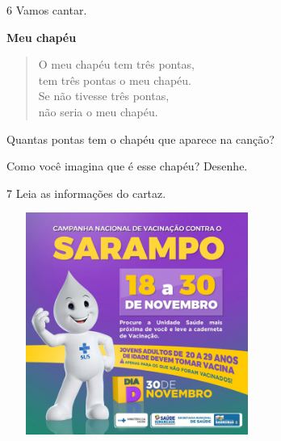\num{6} Vamos cantar.

\textbf{Meu chapéu}

\begin{verse}
O meu chapéu tem três pontas,\\
tem três pontas o meu chapéu.\\
Se não tivesse três pontas,\\
não seria o meu chapéu.
\end{verse}


\begin{escolha}
\item Quantas pontas tem o chapéu que aparece na canção?


\item Como você imagina que é esse chapéu? Desenhe.

\begin{mdframed}[linewidth=2pt,linecolor=salmao,roundcorner=10pt]
\vspace{5cm}
\end{mdframed}
\end{escolha}

\num{7} Leia as informações do cartaz.


\includegraphics[width=3.36943in,height=2.86363in]{media/image85.jpeg}

